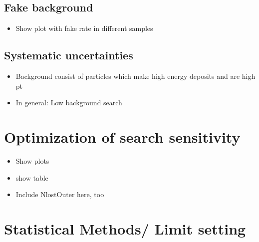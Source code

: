 \subsection{Fake background}
\label{sec:FakeBkg}

\begin{itemize}
\item Show plot with fake rate in different samples
\end{itemize}

\subsection{Systematic uncertainties}
\label{sec:SysUncertaintiesBkg}


\begin{itemize}
\item Background consist of particles which make high energy deposits and are high pt
\item In general: Low background search
\end{itemize}


\newpage
\section{Optimization of search sensitivity}
\label{sec:Optimization}
\begin{itemize}
\item Show plots
\item show table
\item Include NlostOuter here, too
\end{itemize}

\section{Statistical Methods/ Limit setting}
\label{sec:LimitSetting}

